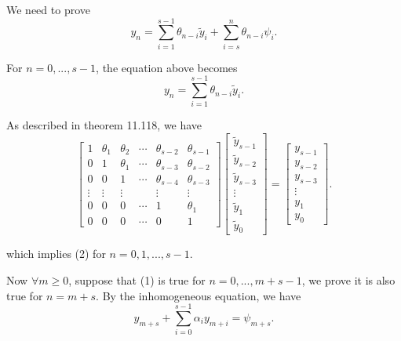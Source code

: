 \documentclass[twoside,a4paper]{article}
\begin{document}
\;\;\;\; We need to prove
\begin{equation}
    y_n=\sum_{i=1}^{s-1}\theta_{n-i}\tilde{y}_i + \sum_{i=s}^n \theta_{n-i}\psi_i.
\end{equation}

For $n=0,...,s-1$, the equation above becomes
\begin{equation}
    y_n=\sum_{i=1}^{s-1}\theta_{n-i}\tilde{y}_i.
\end{equation}

As described in theorem 11.118, we have
\begin{equation*}
    \begin{bmatrix}
        1 & \theta_1 & \theta _2 & \cdots & \theta_{s-2} & \theta_{s-1}\\
        0 & 1 & \theta_1 & \cdots & \theta_{s-3} & \theta_{s-2}\\
        0 & 0 & 1 & \cdots & \theta_{s-4} & \theta_{s-3}\\
        \vdots & \vdots & \vdots & & \vdots & \vdots \\
        0 & 0 & 0 & \cdots & 1 & \theta_1\\
        0 & 0 & 0 & \cdots & 0 & 1
    \end{bmatrix}
    \begin{bmatrix}
        \tilde{y}_{s-1} \\ \tilde{y}_{s-2} \\ \tilde{y}_{s-3} \\ \vdots \\ \tilde{y}_{1} \\ \tilde{y}_{0}
    \end{bmatrix}=
    \begin{bmatrix}
        y_{s-1} \\ y_{s-2} \\ y_{s-3} \\ \vdots \\ y_{1} \\ y_0
    \end{bmatrix}.
\end{equation*}

which implies (2) for $n=0,1,...,s-1$. 

Now $\forall m\geq 0$, suppose that (1) is true for $n=0,...,m+s-1$, we prove it is also true for $n=m+s$. By the inhomogeneous equation, we have
\begin{equation*}
    y_{m+s}+\sum_{i=0}^{s-1} \alpha_iy_{m+i}=\psi_{m+s}.
\end{equation*}
\end{document}
